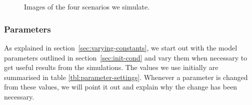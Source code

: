 \begin{figure}[h]
    \centering
    \begin{minipage}{0.45\textwidth}
        \centering
        \\
        \subfloat[Bottleneck.]{
        \resizebox{\textwidth}{!}{}
        \label{subfig:image-bottleneck}
    	}
    \end{minipage}
    \begin{minipage}{0.45\textwidth}
        \centering
        \vspace{1.4cm}
		\subfloat[Corridor.]{
        \resizebox{\textwidth}{!}{}
        \label{subfig:image-corridor}       
 		}
		\\
        \vspace{6mm}
    \end{minipage}
    \caption{Images of the four scenarios we simulate.}
    \label{fig:fourcases}
\end{figure}

\subsubsection{Parameters}
As explained in section~\ref{sec:varying-constants}, we start out with the 
model parameters outlined in section~\ref{sec:init-cond} and vary them when 
necessary to get useful results from the simulations.  The values we use 
initially are summarised in table \ref{tbl:parameter-settings}. Whenever a 
parameter is changed from these values, we will point it out and explain why 
the change has been necessary.

